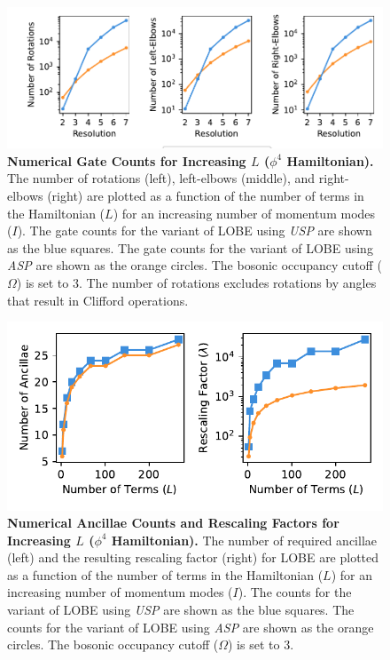 \begin{figure}
    \centering
    \includegraphics[width=16cm]{figures/phi4_hamiltonian_gates_vs_terms.pdf}
    \caption{
        \textbf{Numerical Gate Counts for Increasing $L$ ($\phi^4$ Hamiltonian).}
        The number of rotations (left), left-elbows (middle), and right-elbows (right) are plotted as a function of the number of terms in the Hamiltonian ($L$) for an increasing number of momentum modes ($I$).
        The gate counts for the variant of LOBE using \textit{USP} are shown as the blue squares.
        The gate counts for the variant of LOBE using \textit{ASP} are shown as the orange circles.
        The bosonic occupancy cutoff ($\Omega$) is set to $3$.
        The number of rotations excludes rotations by angles that result in Clifford operations.
    }
    \label{fig:phi4_hamiltonian_gates_vs_terms}
\end{figure}
\begin{figure}
    \centering
    \includegraphics[width=12cm]{figures/phi4_hamiltonian_qubits_and_rescaling_vs_terms.pdf}
    \caption{
        \textbf{Numerical Ancillae Counts and Rescaling Factors for Increasing $L$ ($\phi^4$ Hamiltonian).}
        The number of required ancillae (left) and the resulting rescaling factor (right) for LOBE are plotted as a function of the number of terms in the Hamiltonian ($L$) for an increasing number of momentum modes ($I$).
        The counts for the variant of LOBE using \textit{USP} are shown as the blue squares.
        The counts for the variant of LOBE using \textit{ASP} are shown as the orange circles.
        The bosonic occupancy cutoff ($\Omega$) is set to $3$.
    }
    \label{fig:phi4_hamiltonian_qubits_and_rescaling_vs_terms}
\end{figure}

